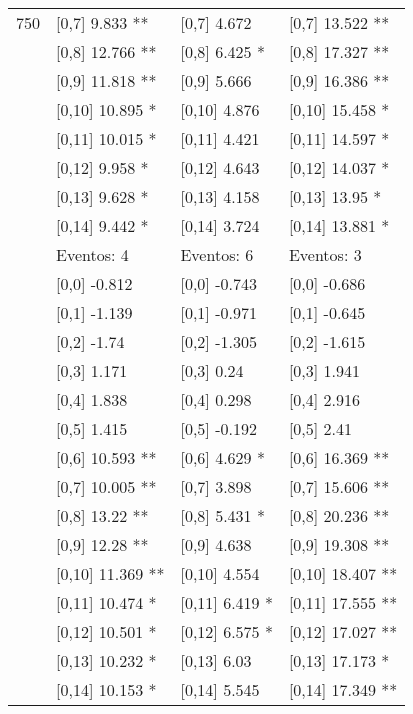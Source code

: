 \begin{table}
\begin{tabular}[t]{llll}
750 & {}[0,7] 9.833 ** & {}[0,7] 4.672 & {}[0,7] 13.522 **\\
\addlinespace
 & {}[0,8] 12.766 ** & {}[0,8] 6.425 * & {}[0,8] 17.327 **\\
 & {}[0,9] 11.818 ** & {}[0,9] 5.666 & {}[0,9] 16.386 **\\
 & {}[0,10] 10.895 * & {}[0,10] 4.876 & {}[0,10] 15.458 *\\
 & {}[0,11] 10.015 * & {}[0,11] 4.421 & {}[0,11] 14.597 *\\
 & {}[0,12] 9.958 * & {}[0,12] 4.643 & {}[0,12] 14.037 *\\
\addlinespace
 & {}[0,13] 9.628 * & {}[0,13] 4.158 & {}[0,13] 13.95 *\\
 & {}[0,14] 9.442 * & {}[0,14] 3.724 & {}[0,14] 13.881 *\\
 & Eventos:  4 & Eventos:  6 & Eventos:  3\\
 & {}[0,0] -0.812 & {}[0,0] -0.743 & {}[0,0] -0.686\\
 & {}[0,1] -1.139 & {}[0,1] -0.971 & {}[0,1] -0.645\\
\addlinespace
 & {}[0,2] -1.74 & {}[0,2] -1.305 & {}[0,2] -1.615\\
 & {}[0,3] 1.171 & {}[0,3] 0.24 & {}[0,3] 1.941\\
 & {}[0,4] 1.838 & {}[0,4] 0.298 & {}[0,4] 2.916\\
 & {}[0,5] 1.415 & {}[0,5] -0.192 & {}[0,5] 2.41\\
 & {}[0,6] 10.593 ** & {}[0,6] 4.629 * & {}[0,6] 16.369 **\\
\addlinespace
1000 & {}[0,7] 10.005 ** & {}[0,7] 3.898 & {}[0,7] 15.606 **\\
 & {}[0,8] 13.22 ** & {}[0,8] 5.431 * & {}[0,8] 20.236 **\\
 & {}[0,9] 12.28 ** & {}[0,9] 4.638 & {}[0,9] 19.308 **\\
 & {}[0,10] 11.369 ** & {}[0,10] 4.554 & {}[0,10] 18.407 **\\
 & {}[0,11] 10.474 * & {}[0,11] 6.419 * & {}[0,11] 17.555 **\\
\addlinespace
 & {}[0,12] 10.501 * & {}[0,12] 6.575 * & {}[0,12] 17.027 **\\
 & {}[0,13] 10.232 * & {}[0,13] 6.03 & {}[0,13] 17.173 *\\
 & {}[0,14] 10.153 * & {}[0,14] 5.545 & {}[0,14] 17.349 **\\
\bottomrule
\end{tabular}
\end{table}
